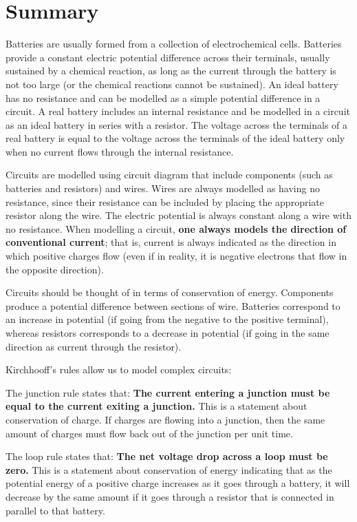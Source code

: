 \section{Summary}

\begin{chapterSummary}
Batteries are usually formed from a collection of electrochemical cells. Batteries provide a constant electric potential difference across their terminals, usually sustained by a chemical reaction, as long as the current through the battery is not too large (or the chemical reactions cannot be sustained). An ideal battery has no resistance and can be modelled as a simple potential difference in a circuit. A real battery includes an internal resistance and be modelled in a circuit as an ideal battery in series with a resistor. The voltage across the terminals of a real battery is equal to the voltage across the terminals of the ideal battery only when no current flows through the internal resistance. 

Circuits are modelled using circuit diagram that include components (such as batteries and resistors) and wires. Wires are always modelled as having no resistance, since their resistance can be included by placing the appropriate resistor along the wire. The electric potential is always constant along a wire with no resistance. When modelling a circuit, \textbf{one always models the direction of conventional current}; that is, current is always indicated as the direction in which positive charges flow (even if in reality, it is negative electrons that flow in the opposite direction).

Circuits should be thought of in terms of conservation of energy. Components produce a potential difference between sections of wire. Batteries correspond to an increase in potential (if going from the negative to the positive terminal), whereas resistors corresponds to a decrease in potential (if going in the same direction as current through the resistor). 

Kirchhooff's rules allow us to model complex circuits:
 
The junction rule states that: \textbf{The current entering a junction must be equal to the current exiting a junction.} This is a statement about conservation of charge. If charges are flowing into a junction, then the same amount of charges must flow back out of the junction per unit time.

The loop rule states that: \textbf{The net voltage drop across a loop must be zero.} This is a statement about conservation of energy indicating that as the potential energy of a positive charge increases as it goes through a battery, it will decrease by the same amount if it goes through a resistor that is connected in parallel to that battery.


\end{chapterSummary}
